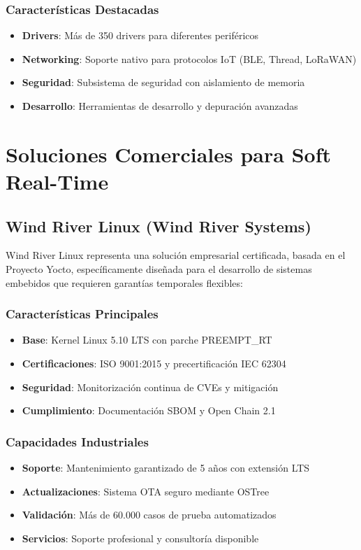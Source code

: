         \subsubsection{Características Destacadas}
            \begin{itemize}
                \item \textbf{Drivers}: Más de 350 drivers para diferentes periféricos
                \item \textbf{Networking}: Soporte nativo para protocolos IoT (BLE, Thread, LoRaWAN)
                \item \textbf{Seguridad}: Subsistema de seguridad con aislamiento de memoria
                \item \textbf{Desarrollo}: Herramientas de desarrollo y depuración avanzadas
            \end{itemize}

\newpage
\section{Soluciones Comerciales para Soft Real-Time}
    \subsection{Wind River Linux (Wind River Systems)}
        Wind River Linux representa una solución empresarial certificada, basada en el Proyecto Yocto, específicamente diseñada para el desarrollo de sistemas embebidos que requieren garantías temporales flexibles:

        \subsubsection{Características Principales}
            \begin{itemize}
                \item \textbf{Base}: Kernel Linux 5.10 LTS con parche PREEMPT\_RT
                \item \textbf{Certificaciones}: ISO 9001:2015 y precertificación IEC 62304
                \item \textbf{Seguridad}: Monitorización continua de CVEs y mitigación
                \item \textbf{Cumplimiento}: Documentación SBOM y Open Chain 2.1
            \end{itemize}

        \subsubsection{Capacidades Industriales}
            \begin{itemize}
                \item \textbf{Soporte}: Mantenimiento garantizado de 5 años con extensión LTS
                \item \textbf{Actualizaciones}: Sistema OTA seguro mediante OSTree
                \item \textbf{Validación}: Más de 60.000 casos de prueba automatizados
                \item \textbf{Servicios}: Soporte profesional y consultoría disponible
            \end{itemize}

